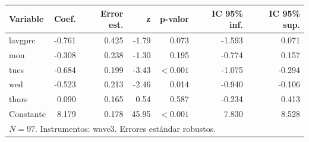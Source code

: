 
\begin{tabular}{lrrrrrr}
\toprule
Variable & Coef. & Error est. & z & p-valor & IC 95\% inf. & IC 95\% sup.\\
\midrule
lavgprc & -0.761 & 0.425 & -1.79 & 0.073 & -1.593 & 0.071\\
mon & -0.308 & 0.238 & -1.30 & 0.195 & -0.774 & 0.157\\
tues & -0.684 & 0.199 & -3.43 & $<0.001$ & -1.075 & -0.294\\
wed & -0.523 & 0.213 & -2.46 & 0.014 & -0.940 & -0.106\\
thurs & 0.090 & 0.165 & 0.54 & 0.587 & -0.234 & 0.413\\
Constante & 8.179 & 0.178 & 45.95 & $<0.001$ & 7.830 & 8.528\\
\midrule
\multicolumn{7}{l}{$N=97$. Instrumentos: wave3. Errores estándar robustos.}\\
\bottomrule
\end{tabular}
